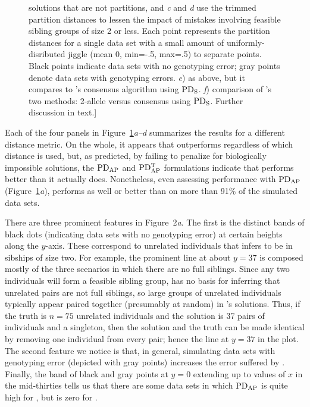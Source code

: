\documentclass[11pt]{article}
\begin{document}
{\begin{figure}
solutions that are not partitions, and {\em c} and {\em d} use the trimmed partition distances to 
lessen the impact of mistakes involving feasible sibling groups of size 2 or less. Each point 
represents the partition distances for a single data set with a small amount of uniformly-disributed 
jiggle (mean 0, min=-.5, max=.5) to separate points. Black points indicate data sets with no genotyping 
error; gray points denote data sets with genotyping errors. {\em e}) as above, but it compares 
\colony{} to \kinalyzer's consensus algorithm using $\mathrm{PD_S}$.  {\em f}) comparison of \kinalyzer{}'s two 
methods: 2-allele versus consensus using $\mathrm{PD_S}$.  Further discussion in text.]{}
\label{fig:cvksmear}
\end{figure}

Each of the four panels in Figure~\ref{fig:cvksmear}{\em a--d} summarizes the results for a different 
distance metric.  On the whole, it appears that \colony{} outperforms \kinalyzer{} regardless of which 
distance is used, but, as predicted, by failing to penalize for biologically impossible solutions, the 
$\mathrm{PD_{AP}}$ and $\mathrm{PD_{AP}^T}$ formulations indicate that \kinalyzer{} performs better than it actually does.   
Nonetheless, even assessing performance with $\mathrm{PD_{AP}}$ (Figure~\ref{fig:cvksmear}{\em a}), \colony{} 
performs as well or better than \kinalyzer{} on more than 91\% of the simulated data sets. 

There are three prominent features in Figure~2{\em a}.  The first is the distinct bands of black dots 
(indicating data sets with no genotyping error) at certain heights along the $y$-axis.  These 
correspond to unrelated individuals that \kinalyzer{} infers to be in sibships of size two.  For 
example, the prominent line at about $y=37$ is composed mostly of the three scenarios in which there 
are no full siblings. Since any two individuals will form a feasible sibling group, \kinalyzer{} has no 
basis for inferring that unrelated pairs are not full siblings, so large groups of unrelated 
individuals typically appear paired together (presumably at random) in \kinalyzer{}'s solutions.  Thus, 
if the truth is $n=75$ unrelated individuals and the \kinalyzer{} solution is 37 pairs of individuals 
and a singleton, then the \kinalyzer{} solution and the truth can be made identical by removing one 
individual from every pair; hence the line at $y=37$ in the plot. The second feature we notice is that, 
in general, simulating data sets with genotyping error (depicted with gray points) increases the error 
suffered by \kinalyzer{}.  Finally, the band of black and gray points at $y=0$ extending up to values 
of $x$ in the mid-thirties tells us that there are some data sets in which $\mathrm{PD_{AP}}$ is quite high for 
\colony{}, but is zero for \kinalyzer{}.  

}
\end{document}
